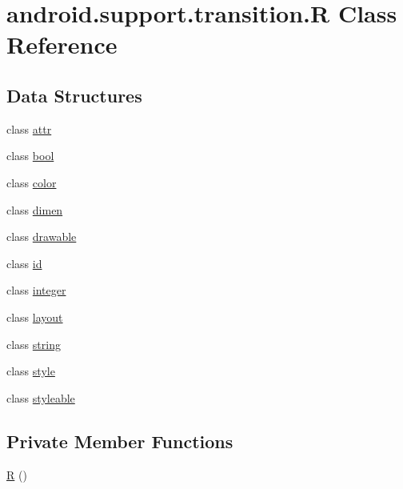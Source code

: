 \hypertarget{classandroid_1_1support_1_1transition_1_1_r}{}\section{android.\+support.\+transition.\+R Class Reference}
\label{classandroid_1_1support_1_1transition_1_1_r}
\subsection*{Data Structures}
\begin{DoxyCompactItemize}
\item 
class \mbox{\hyperlink{classandroid_1_1support_1_1transition_1_1_r_1_1attr}{attr}}
\item 
class \mbox{\hyperlink{classandroid_1_1support_1_1transition_1_1_r_1_1bool}{bool}}
\item 
class \mbox{\hyperlink{classandroid_1_1support_1_1transition_1_1_r_1_1color}{color}}
\item 
class \mbox{\hyperlink{classandroid_1_1support_1_1transition_1_1_r_1_1dimen}{dimen}}
\item 
class \mbox{\hyperlink{classandroid_1_1support_1_1transition_1_1_r_1_1drawable}{drawable}}
\item 
class \mbox{\hyperlink{classandroid_1_1support_1_1transition_1_1_r_1_1id}{id}}
\item 
class \mbox{\hyperlink{classandroid_1_1support_1_1transition_1_1_r_1_1integer}{integer}}
\item 
class \mbox{\hyperlink{classandroid_1_1support_1_1transition_1_1_r_1_1layout}{layout}}
\item 
class \mbox{\hyperlink{classandroid_1_1support_1_1transition_1_1_r_1_1string}{string}}
\item 
class \mbox{\hyperlink{classandroid_1_1support_1_1transition_1_1_r_1_1style}{style}}
\item 
class \mbox{\hyperlink{classandroid_1_1support_1_1transition_1_1_r_1_1styleable}{styleable}}
\end{DoxyCompactItemize}
\subsection*{Private Member Functions}
\begin{DoxyCompactItemize}
\item 
\mbox{\hyperlink{classandroid_1_1support_1_1transition_1_1_r_a49cf49904e6f9e2952a6503f2f307b08}{R}} ()
\end{DoxyCompactItemize}


